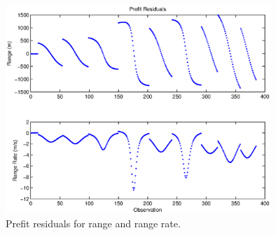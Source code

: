 \documentclass[]{aiaa-tc}%
\begin{document}
	\begin{figure}[H]
		\centering
		\includegraphics[width = 10cm]{Batch_Prefit.eps}
		\caption{Prefit residuals for range and range rate. }
		\label{fig:Prefit}
	\end{figure}	
\end{document}
